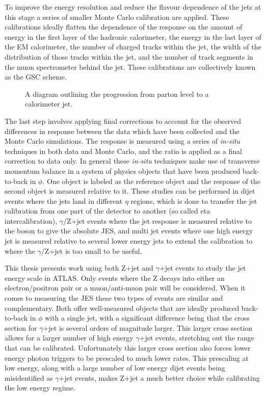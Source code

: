 To improve the energy resolution and reduce the flavour dependence of the jets at this stage a series of smaller Monte Carlo calibration are applied.  
These calibrations ideally flatten the dependence of the response on the amount of energy in the first layer of the hadronic calorimeter, the energy in the last layer of the EM calorimeter, the number of charged tracks within the jet, the width of the distribution of those tracks within the jet, and the number of track segments in the muon spectrometer behind the jet.  
These calibrations are collectively known as the \gls{GSC} scheme.  

\begin{figure}[!ht]
  \begin{center}
  \end{center}
  \caption[Jet calibration sequence used by ATLAS.]
      {\small A diagram outlining the progression from parton level to a calorimeter jet.}
  \label{Fig:JetCalibSequenceFig}
\end{figure}


The last step involves applying final corrections to account for the observed differences in response between the data which have been collected and the Monte Carlo simulations.  
The response is measured using a series of \textit{in-situ} techniques in both data and Monte Carlo, and the ratio is applied as a final correction to data only.  
In general these \textit{in-situ} techniques make use of transverse momentum balance in a system of physics objects that have been produced back-to-back in $\phi$.  
One object is labeled as the reference object and the response of the second object is measured relative to it.  
These studies can be performed in dijet events where the jets land in different $\eta$ regions, which is done to transfer the jet calibration from one part of the detector to another (so called eta intercalibration), $\gamma$/Z+jet events where the jet response is measured relative to the boson to give the absolute JES, and multi jet events where one high energy jet is measured relative to several lower energy jets to extend the calibration to where the $\gamma$/Z+jet is too small to be useful.  

This thesis presents work using both Z+jet and $\gamma$+jet events to study the jet energy scale in ATLAS.  
Only events where the Z decays into either an electron/positron pair or a muon/anti-muon pair will be considered.  
When it comes to measuring the JES these two types of events are similar and complementary.  
Both offer well-measured objects that are ideally produced back-to-back in $\phi$ with a single jet, with a significant difference being that the cross section for $\gamma$+jet is several orders of magnitude larger.   
This larger cross section allows for a larger number of high energy $\gamma$+jet events, stretching out the range that can be calibrated.  
Unfortunately this larger cross section also forces lower energy photon triggers to be prescaled to much lower rates.  
This prescaling at low energy, along with a large number of low energy dijet events being misidentified as $\gamma$+jet events, makes Z+jet a much better choice while calibrating the low energy regime.  

